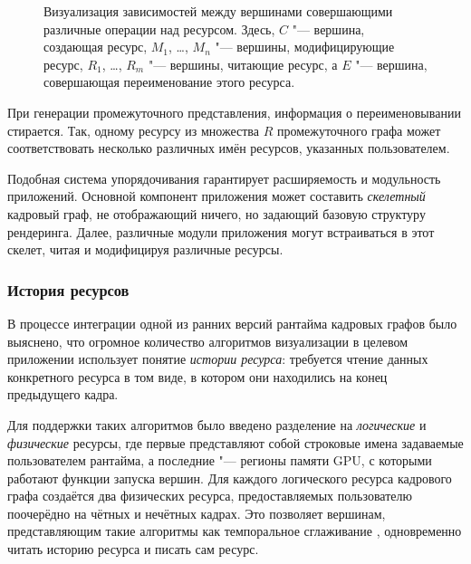 \begin{figure*}[ht]
\centering
{}
\caption{Визуализация зависимостей между вершинами совершающими различные операции над ресурсом. Здесь, $C$ "--- вершина, создающая ресурс, $M_1$, \dots, $M_n$ "--- вершины, модифицирующие ресурс, $R_1$, \dots, $R_m$ "--- вершины, читающие ресурс, а $E$ "--- вершина, совершающая переименование этого ресурса.}
\label{fig:nodeOrdering}
\end{figure*}


При генерации промежуточного представления, информация о переименовывании стирается.
Так, одному ресурсу из множества $R$ промежуточного графа может соответствовать несколько различных имён ресурсов, указанных пользователем.

Подобная система упорядочивания гарантирует расширяемость и модульность приложений. Основной компонент приложения может составить \textit{скелетный} кадровый граф, не отображающий ничего, но задающий базовую структуру рендеринга.
Далее, различные модули приложения могут встраиваться в этот скелет, читая и модифицируя различные ресурсы.

\subsubsection{История ресурсов}
В процессе интеграции одной из ранних версий рантайма кадровых графов было выяснено, что огромное количество алгоритмов визуализации в целевом приложении использует понятие \textit{истории ресурса}: требуется чтение данных конкретного ресурса в том виде, в котором они находились на конец предыдущего кадра.

Для поддержки таких алгоритмов было введено разделение на \textit{логические} и \textit{физические} ресурсы, где первые представляют собой строковые имена задаваемые пользователем рантайма, а последние "--- регионы памяти GPU, с которыми работают функции запуска вершин.
Для каждого логического ресурса кадрового графа создаётся два физических ресурса, предоставляемых пользователю поочерёдно на чётных и нечётных кадрах.
Это позволяет вершинам, представляющим такие алгоритмы как темпоральное сглаживание \cite{yang2020survey}, одновременно читать историю ресурса и писать сам ресурс.

